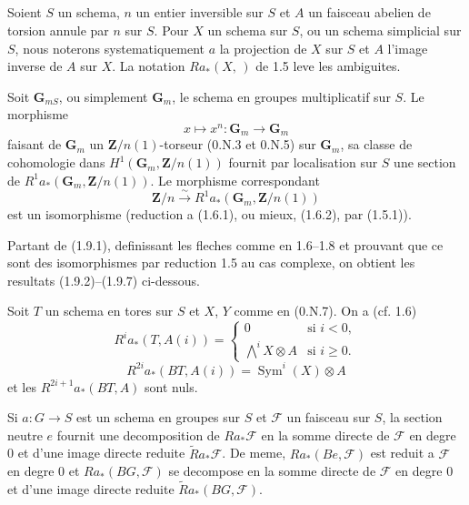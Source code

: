 \documentclass[11pt,a4paper]{article}
\theoremstyle{plain}
\theoremstyle{definition}
\DeclareMathOperator{\Sym}{Sym}
\begin{document}
\subsection{}\label{1.9}

Soient $S$ un schema, $n$ un entier inversible sur $S$ et $A$ un faisceau abelien de torsion annule par $n$ sur $S$. Pour $X$ un schema sur $S$, ou un schema simplicial sur $S$, nous noterons systematiquement $a$ la projection de $X$ sur $S$ et $A$ l'image inverse de $A$ sur $X$. La notation $R a_*(X, \,)$ de 1.5 leve les ambiguites.

Soit $\mathbf{G}_{mS}$, ou simplement $\mathbf{G}_m$, le schema en groupes multiplicatif sur $S$. Le morphisme
\[
x \mapsto x^n : \mathbf{G}_m \to \mathbf{G}_m
\]
faisant de $\mathbf{G}_m$ un $\mathbf{Z}/n(1)$-torseur (0.N.3 et 0.N.5) sur $\mathbf{G}_m$, sa classe de cohomologie dans $H^1(\mathbf{G}_m, \mathbf{Z}/n(1))$ fournit par localisation sur $S$ une section de $R^1 a_* (\mathbf{G}_m, \mathbf{Z}/n(1))$. Le morphisme correspondant
\begin{equation}\label{1.9.1}
\mathbf{Z}/n \xrightarrow{\sim} R^1 a_* (\mathbf{G}_m, \mathbf{Z}/n(1))
\end{equation}
est un isomorphisme (reduction a (1.6.1), ou mieux, (1.6.2), par (1.5.1)).

Partant de (1.9.1), definissant les fleches comme en 1.6--1.8 et prouvant que ce sont des isomorphismes par reduction 1.5 au cas complexe, on obtient les resultats (1.9.2)--(1.9.7) ci-dessous.

Soit $T$ un schema en tores sur $S$ et $X$, $Y$ comme en (0.N.7). On a (cf. 1.6)
\begin{equation}\label{1.9.2}
R^i a_* (T, A(i)) =
\begin{cases}
0 & \text{si } i < 0, \\
\bigwedge^i X \otimes A & \text{si } i \geq 0.
\end{cases}
\end{equation}
\begin{equation}\label{1.9.3}
R^{2i} a_* (BT, A(i)) = \Sym^i(X) \otimes A
\end{equation}
et les $R^{2i+1} a_* (BT, A)$ sont nuls.

Si $a : G \to S$ est un schema en groupes sur $S$ et $\mathscr{F}$ un faisceau sur $S$, la section neutre $e$ fournit une decomposition de $R a_* \mathscr{F}$ en la somme directe de $\mathscr{F}$ en degre 0 et d'une image directe reduite $\widetilde{R} a_* \mathscr{F}$. De meme, $R a_*(Be, \mathscr{F})$ est reduit a $\mathscr{F}$ en degre 0 et $R a_*(BG, \mathscr{F})$ se decompose en la somme directe de $\mathscr{F}$ en degre 0 et d'une image directe reduite $\widetilde{R} a_*(BG, \mathscr{F})$.
\end{document}
